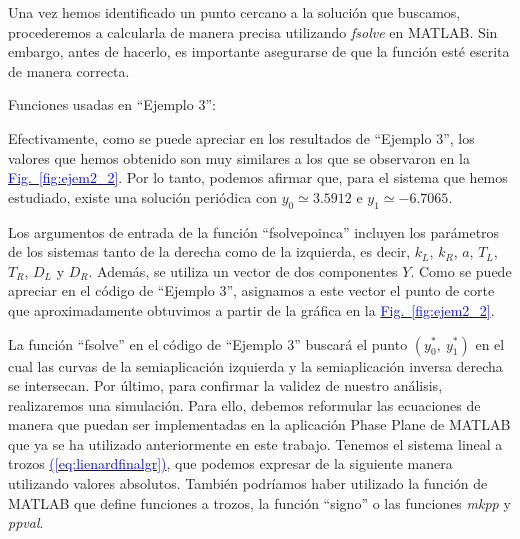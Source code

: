 \documentclass[12pt,a4paper]{report} %
\newcommand{\fref}[1]{\hyperref[#1]{\textcolor{blue}{Fig.~\ref*{#1}}}}
\newcommand{\eref}[1]{\hyperref[#1]{\textcolor{blue}{(\ref*{#1})}}}
\begin{document}
	Una vez hemos identificado un punto cercano a la solución que buscamos, procederemos a calcularla de manera precisa utilizando \textit{fsolve} en MATLAB. Sin embargo, antes de hacerlo, es importante asegurarse de que la función esté escrita de manera correcta.
		
	\vspace{1cm}
	
	\vspace{1cm}
	
	\newpage
	
	\noindent Funciones usadas en ``Ejemplo 3'':
	\vspace{0.5cm}
	\vspace{0.5cm}
	
	\vspace{1cm} Efectivamente, como se puede apreciar en los resultados de ``Ejemplo 3'', los valores que hemos obtenido son muy similares a los que se observaron en la \fref{fig:ejem2_2}. Por lo tanto, podemos afirmar que, para el sistema que hemos estudiado, existe una solución periódica con $y_0\simeq3.5912$ e $y_1\simeq-6.7065$.

	
	\vspace{0.5cm}Los argumentos de entrada de la función ``fsolvepoinca'' incluyen los parámetros de los sistemas tanto de la derecha como de la izquierda, es decir, $k_L$, $k_R$, $a$, $T_L$, $T_R$, $D_L$ y $D_R$. Además, se utiliza un vector de dos componentes $Y$. Como se puede apreciar en el código de ``Ejemplo 3'', asignamos a este vector el punto de corte que aproximadamente obtuvimos a partir de la gráfica en la \fref{fig:ejem2_2}.
	
	
	\vspace{0.5cm}La función ``fsolve'' en el código de ``Ejemplo 3'' buscará el punto $\left(y_0^*,\: y_1^*\right)$ en el cual las curvas de la semiaplicación izquierda y la semiaplicación inversa derecha se intersecan.
	\newpage
	Por último, para confirmar la validez de nuestro análisis, realizaremos una simulación. Para ello, debemos reformular las ecuaciones de manera que puedan ser implementadas en la aplicación Phase Plane de MATLAB que ya se ha utilizado anteriormente en este trabajo. Tenemos el sistema lineal a trozos \eref{eq:lienardfinalgr}, que podemos expresar de la siguiente manera utilizando valores absolutos. También podríamos haber utilizado la función de MATLAB que define funciones a trozos, la función ``signo'' o las funciones \textit{mkpp} y \textit{ppval}.
	
\end{document}
